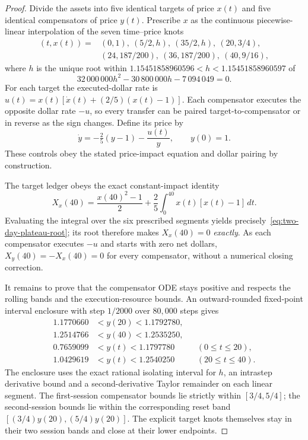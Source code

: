 \documentclass[review,hidelinks,onefignum,onetabnum]{siamonline250211}
\begin{document}
\begin{proof}
Divide the assets into five identical targets of price $x(t)$ and five identical compensators of price $y(t)$. Prescribe $x$ as the continuous piecewise-linear interpolation of the seven time--price knots
\begin{equation}\label{eq:two-day-knots}
\begin{aligned}
(t,x(t))={}&(0,1),\ (5/2,h),\ (35/2,h),\ (20,3/4),\\
          &(24,187/200),\ (36,187/200),\ (40,9/16),
\end{aligned}
\end{equation}
where $h$ is the unique root within
$1.15451858960596<h<1.15451858960597$ of
\begin{equation}\label{eq:two-day-plateau-root}
32\,000\,000h^2-30\,800\,000h-7\,094\,049=0.
\end{equation}
For each target the executed-dollar rate is
$u(t)=x(t)[\dot x(t)+(2/5)(x(t)-1)]$.
Each compensator executes the opposite dollar rate $-u$, so every transfer can be paired target-to-compensator or in reverse as the sign changes. Define its price by
\begin{equation}\label{eq:two-day-compensator}
\dot y=-\tfrac25(y-1)-\frac{u(t)}{y},
\qquad y(0)=1.
\end{equation}
These controls obey the stated price-impact equation and dollar pairing by construction.

The target ledger obeys the exact constant-impact identity
\[
 X_x(40)=\frac{x(40)^2-1}{2}
 +\frac25\int_0^{40}x(t)[x(t)-1]\,dt.
\]
Evaluating the integral over the six prescribed segments yields precisely~\eqref{eq:two-day-plateau-root}; its root therefore makes $X_x(40)=0$ \emph{exactly}. As each compensator executes $-u$ and starts with zero net dollars, $X_y(40)=-X_x(40)=0$ for every compensator, without a numerical closing correction.

It remains to prove that the compensator ODE stays positive and respects the rolling bands and the execution-resource bounds. An outward-rounded fixed-point interval enclosure with step $1/2000$ over $80{,}000$ steps gives
\begin{equation}\label{eq:two-day-y-certified}
\begin{aligned}
 1.1770660&<y(20)<1.1792780,\\
 1.2514766&<y(40)<1.2535250,\\
 0.7659099&<y(t)<1.1797780 &&(0\le t\le20),\\
 1.0429619&<y(t)<1.2540250 &&(20\le t\le40).
\end{aligned}
\end{equation}
The enclosure uses the exact rational isolating interval for $h$, an intrastep derivative bound and a second-derivative Taylor remainder on each linear segment. The first-session compensator bounds lie strictly within $[3/4,5/4]$; the second-session bounds lie within the corresponding reset band $[(3/4)y(20),(5/4)y(20)]$. The explicit target knots themselves stay in their two session bands and close at their lower endpoints.


\end{proof}
\end{document}
